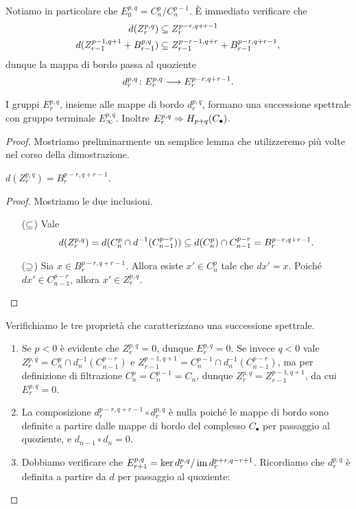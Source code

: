 Notiamo in particolare che $E^{p,q}_0=C^p_n/C^{p-1}_n$. È immediato verificare che
\begin{align*}
d(Z^{p,q}_r)&\subseteq Z^{p-r,q+r-1}_r\\
d(Z^{p-1,q+1}_{r-1}+B^{p,q}_{r-1})&\subseteq Z^{p-r-1,q+r}_{r-1}+B^{p-r,q+r-1}_{r-1},
\end{align*}
dunque la mappa di bordo passa al quoziente
$$
\map{d^{p,q}_r}{E^{p,q}_r}{E^{p-r,q+r-1}_r}.
$$
\begin{proposition}
I gruppi $E^{p,q}_r$, insieme alle mappe di bordo $d^{p,q}_r$, formano una successione spettrale con gruppo terminale $E^{p,q}_\infty$. Inoltre $E^{p,q}_r\Rightarrow H_{p+q}(C_\bullet)$.
\end{proposition}
\begin{proof}
Mostriamo preliminarmente un semplice lemma che utilizzeremo più volte nel corso della dimostrazione.
\begin{lemma*}
$d(Z^{p,q}_r)=B^{p-r,q+r-1}_r$.
\end{lemma*}
\begin{proof}
Mostriamo le due inclusioni.
\begin{itemize}
\item[($\subseteq$)] Vale
$$
d(Z^{p,q}_r)=d(C^p_n\cap d^{-1}(C^{p-r}_{n-1}))\subseteq d(C^p_n)\cap C^{p-r}_{n-1}=B^{p-r,q+r-1}_r.
$$
\item[($\supseteq$)] Sia $x\in B^{p-r,q+r-1}_r$. Allora esiste $x'\in C^p_n$ tale che $dx'=x$. Poiché $dx'\in C^{p-r}_{n-1}$, allora $x'\in Z^{p,q}_r$.\qedhere
\end{itemize}
\end{proof}
Verifichiamo le tre proprietà che caratterizzano una successione spettrale.
\begin{enumerate}
\item Se $p<0$ è evidente che $Z^{p,q}_r=0$, dunque $E^{p,q}_r=0$. Se invece $q<0$ vale $Z^{p,q}_r=C^p_n\cap d_n^{-1}(C^{p-r}_{n-1})$ e $Z^{p-1,q+1}_{r-1}=C^{p-1}_n\cap d_n^{-1}(C^{p-r}_{n-1})$, ma per definizione di filtrazione $C^p_n=C^{p-1}_n=C_n$, dunque $Z^{p,q}_r=Z^{p-1,q+1}_{r-1}$, da cui $E^{p,q}_r=0$.
\item La composizione $d^{p-r,q+r-1}_r\circ d^{p,q}_r$ è nulla poiché le mappe di bordo sono definite a partire dalle mappe di bordo del complesso $C_\bullet$ per passaggio al quoziente, e $d_{n-1}\circ d_n=0$.
\item Dobbiamo verificare che $E^{p,q}_{r+1}=\ker d^{p,q}_r/\operatorname{im} d^{p+r,q-r+1}_r$. Ricordiamo che $d^{p,q}_r$ è definita a partire da $d$ per passaggio al quoziente:

\end{enumerate}
\end{proof}
